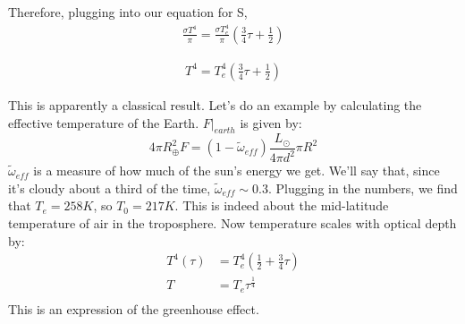 \documentclass{article}
\def\inv#1{\frac1{#1}}
\def\eval#1{\big|_{#1}}
\def\inv#1{{\frac{1}{}#1}}
\def\eval#1{\big|_{#1}}
\begin{document}
Therefore, plugging into our equation for S,
\begin{align}
\frac{\sigma T^4}{\pi} = \frac{\sigma T_e^4}{\pi} ( \frac{3}{4}\tau + \frac{1}{2} )
\end{align}

\begin{align}
 T^4 = T_e^4 ( \frac{3}{4}\tau + \frac{1}{2} )
\end{align}

This is apparently a classical result.  Let's do an example by calculating
the effective temperature of the Earth. $F\eval{earth}$ is given by:
$$4\pi R_\oplus^2F=(1-\tilde\omega_{eff})\frac{L_\odot}{4\pi d^2}\pi R^2$$
$\tilde\omega_{eff}$ is a measure of how much of the sun's energy we get.  We'll
say that, since it's cloudy about a third of the time, $\tilde\omega_{eff}\sim0.3$.
Plugging in the numbers, we find that $T_e=258K$, so $T_0=217K$.  This is
indeed about the mid-latitude temperature of air in the troposphere.  Now
temperature scales with optical depth by:
$$\begin{aligned}T^4(\tau)&=T_e^4\left(\frac{1}{2}+\frac{3}{4}\tau\right)\\ 
T&=T_e\tau^\frac{1}{4}\\ \end{aligned}$$
This is an expression of the greenhouse effect.
\end{document}
